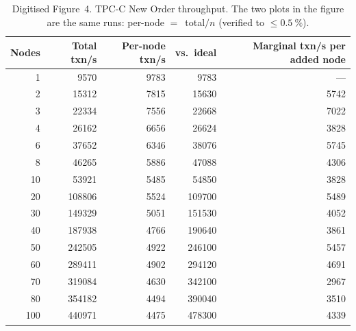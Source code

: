 \documentclass[11pt,a4paper]{article}
\begin{document}
\begin{table}[H]
\centering
\caption{Digitised Figure~4. TPC-C New Order throughput. The two plots in the
figure are the same runs: per-node $=\,$ total$/n$ (verified to
$\le\SI{0.5}{\percent}$).}
\label{tab:fig4}
\begin{tabular}{@{}rrrrr@{}}
\toprule
\textbf{Nodes} & \textbf{Total txn/s} & \textbf{Per-node txn/s} &
\textbf{vs.\ ideal} & \textbf{Marginal txn/s per added node} \\
\midrule
  1  & \num{9570}   & \num{9783}  & \num{9783} & --- \\
  2  & \num{15312}  & \num{7815}  & \num{15630} & \num{5742} \\
  3  & \num{22334}  & \num{7556}  & \num{22668} & \num{7022} \\
  4  & \num{26162}  & \num{6656}  & \num{26624} & \num{3828} \\
  6  & \num{37652}  & \num{6346}  & \num{38076} & \num{5745} \\
  8  & \num{46265}  & \num{5886}  & \num{47088} & \num{4306} \\
 10  & \num{53921}  & \num{5485}  & \num{54850} & \num{3828} \\
 20  & \num{108806} & \num{5524}  & \num{109700} & \num{5489} \\
 30  & \num{149329} & \num{5051}  & \num{151530} & \num{4052} \\
 40  & \num{187938} & \num{4766}  & \num{190640} & \num{3861} \\
 50  & \num{242505} & \num{4922}  & \num{246100} & \num{5457} \\
 60  & \num{289411} & \num{4902}  & \num{294120} & \num{4691} \\
 70  & \num{319084} & \num{4630}  & \num{342100} & \num{2967} \\
 80  & \num{354182} & \num{4494}  & \num{390040} & \num{3510} \\
 \midrule
 100 & \num{440971} & \num{4475}  & \num{478300} & \num{4339} \\
\bottomrule
\end{tabular}
\end{table}
\end{document}
